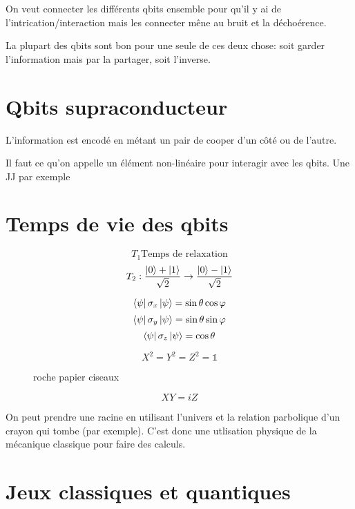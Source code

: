 On veut connecter les différents qbits ensemble pour qu'il y ai de l'intrication/interaction mais les connecter mêne au bruit et la déchoérence.

La plupart des qbits sont bon pour une seule de ces deux chose: soit garder l'information mais par la partager, soit l'inverse.


\section*{Qbits supraconducteur}

L'information est encodé en métant un pair de cooper d'un côté ou de l'autre.

Il faut ce qu'on appelle un élément non-linéaire pour interagir avec les qbits. Une JJ par exemple

\pagebreak
\section*{Temps de vie des qbits}


$$T_1 \text{Temps de relaxation} $$ 
$$T_2 : \frac{\ket{0}+\ket{1}}{\sqrt{2}} \to \frac{\ket{0}-\ket{1}}{\sqrt{2}}  $$ 


\begin{tcolorbox}[title=Sphère de Bloch]
	$$\bra{\psi} \sigma_x \ket{\psi} = \sin\theta\cos\varphi$$ 
	$$\bra{\psi}\sigma_y \ket{\psi} = \sin\theta \sin\varphi $$ 
	$$\bra{\psi}\sigma_z \ket{\psi} = \cos\theta$$ 

	$$X^2=Y^2=Z^{2}= \mathds{1}$$ 

\begin{figure}[ht]
    \centering
    \caption{roche papier ciseaux}
    \label{fig:roche-papier-ciseaux}
\end{figure}

$$XY = iZ$$ 
	 
\end{tcolorbox}


\begin{tcolorbox}[title=Exemple de Calcul de racine carrée]
	 On peut prendre une racine en utilisant l'univers et la relation parbolique d'un crayon qui tombe (par exemple). C'est donc une utlisation physique de la mécanique classique pour faire des calculs.
\end{tcolorbox}


\section*{Jeux classiques et quantiques}

